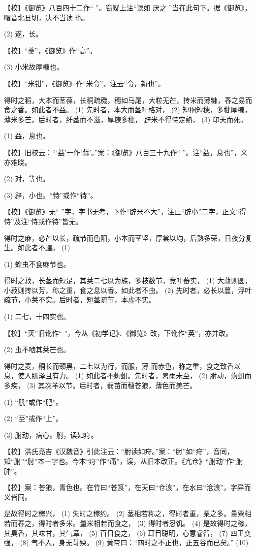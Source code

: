 \documentclass[12pt,UTF8]{ctexbook}
\begin{document}
【校】《御览》八百四十二作“ ”。窃疑上注“读如 厌之 ”当在此句下。据《御览》，噮音北县切，决不当读 也。

(2) 遂，长。

【校】“藳”，《御览》作“高”。

(3) 小米故厚糠也。

【校】“米钳”，《御览》作“米令”，注云“令，新也”。

得时之稻，大本而茎葆，长秱疏穖，穗如马尾，大粒无芒，抟米而薄糠，舂之易而食之香。如此者不益。 (1) 先时者，本大而茎叶格对， (2) 短秱短穗，多秕厚糠，薄米多芒。后时者，纤茎而不滋，厚糠多秕， 辟米不得恃定熟， (3) 卬天而死。

(1) 益，息也。

【校】旧校云：“‘益’一作‘蒜’。”案：《御览》八百三十九作“ ”。注“益，息也”，义亦难晓。

(2) 对，等也。

(3) 辟，小也。“恃”或作“待”。

【校】《御览》无“ ”字，字书无考，下作“辟米不大”，注止“辟小”二字，正文“得恃”及注“恃或作待”皆无。

得时之麻，必芒以长，疏节而色阳，小本而茎坚，厚枲以均，后熟多荣，日夜分复生。如此者不蝗。 (1)

(1) 蝗虫不食麻节也。

得时之菽，长茎而短足，其荚二七以为族，多枝数节，竞叶蕃实， (1) 大菽则圆，小菽则抟以芳，称之重，食之息以香。如此者不虫。 (2) 先时者，必长以蔓，浮叶疏节，小荚不实。后时者，短茎疏节，本虚不实。

(1) 二七，十四实也。

【校】“荚”旧讹作“ ”，今从《初学记》、《御览》改，下讹作“英”，亦并改。

(2) 虫不啮其荚芒也。

得时之麦，秱长而颈黑，二七以为行，而服，薄 而赤色，称之重，食之致香以息，使人肌泽且有力。 (1) 如此者不蚼蛆。先时者，暑雨未至， (2) 胕动，蚼蛆而多疾， (3) 其次羊以节。后时者，弱苗而穗苍狼，薄色而美芒。

(1) “肌”或作“肥”。

(2) “至”或作“上”。

(3) 胕动，病心。胕，读如疛。

【校】洪氏亮吉《汉魏音》引此注云：“胕读如疛。”案：“肘”如“疛”，音同，知“胕”“肘”本一字也。今本“疛”作“痛”，误，从旧本改正。《亢仓》“胕动”作“胕肿”。

【校】案：苍狼，青色也。在竹曰“苍筤”，在天曰“仓浪”，在水曰“沧浪”，字异而义皆同。

是故得时之稼兴， (1) 失时之稼约。 (2) 茎相若称之，得时者重，粟之多。量粟相若而舂之，得时者多米。量米相若而食之， (3) 得时者忍饥。 (4) 是故得时之稼，其臭香，其味甘，其气章， (5) 百日食之， (6) 耳目聪明，心意睿智， (7) 四卫变强， (8) 气不入，身无苛殃。 (9) 黄帝曰：“四时之不正也，正五谷而已矣。” (10)
\end{document}
